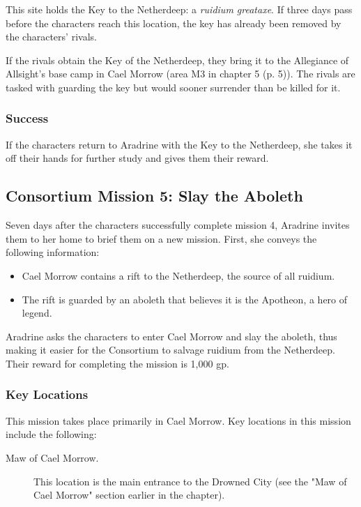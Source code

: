 \documentclass[letterpaper, 11pt, bg=full, twocolumn]{dndbook}
\begin{document}
This site holds the Key to the Netherdeep: a \textit{ruidium greataxe}. If three days pass before the characters reach this location, the key has already been removed by the characters' rivals.

If the rivals obtain the Key of the Netherdeep, they bring it to the Allegiance of Allsight's base camp in Cael Morrow (area M3 in chapter 5 (p. 5)). The rivals are tasked with guarding the key but would sooner surrender than be killed for it.

\subsubsection{Success}

If the characters return to Aradrine with the Key to the Netherdeep, she takes it off their hands for further study and gives them their reward.

\subsection{Consortium Mission 5: Slay the Aboleth}

Seven days after the characters successfully complete mission 4, Aradrine invites them to her home to brief them on a new mission. First, she conveys the following information:

\begin{itemize}
\item Cael Morrow contains a rift to the Netherdeep, the source of all ruidium.
\item The rift is guarded by an aboleth that believes it is the Apotheon, a hero of legend.
\end{itemize}

Aradrine asks the characters to enter Cael Morrow and slay the aboleth, thus making it easier for the Consortium to salvage ruidium from the Netherdeep. Their reward for completing the mission is 1,000 gp.

\subsubsection{Key Locations}

This mission takes place primarily in Cael Morrow. Key locations in this mission include the following:

\begin{description}
\item[Maw of Cael Morrow.] This location is the main entrance to the Drowned City (see the "Maw of Cael Morrow" section earlier in the chapter).
\end{description}
\end{document}
